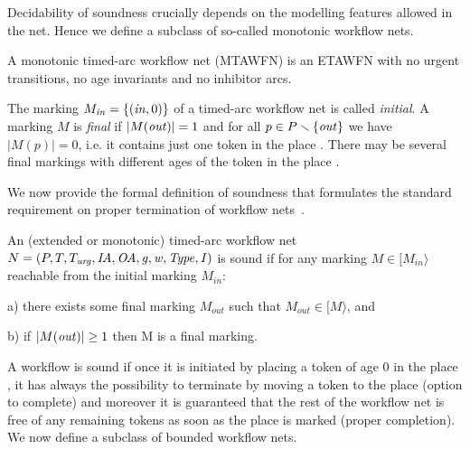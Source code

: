 Decidability of soundness crucially depends on the modelling
features allowed in the net. Hence we define a subclass
of so-called monotonic workflow nets.

\begin{definition} \label{deftawfn}
A monotonic timed-arc workflow net (MTAWFN) is an ETAWFN 
with no urgent transitions, no age invariants and no inhibitor arcs.
\end{definition}

The marking $M_{{\mathit{in}}}=\{(\mathit{in},0)\}$
 of a timed-arc workflow net is called
\emph{initial}. 
A marking $M$ is \emph{final} if 
$|M({\mathit{out}})|= 1$ and for all $p \in P\smallsetminus\{{\mathit{out}}\}$ 
we have $|M(p)|=0$,
i.e. it contains just one token in the place . There may
be several final markings with different ages of the token in the 
place .

We now provide the formal definition of soundness that formulates 
the standard requirement on proper termination of workflow
nets~\cite{Aalst98,AalstHHSVVW11}.

\begin{definition} \label{def:soundness}
An (extended or monotonic) timed-arc workflow net $N=(P, T, T_{\mathit{urg}}, \mathit{IA},\allowbreak \mathit{OA}, \mathit{g}, \mathit{w}, \mathit{Type}, \mathit{I})$ is 
sound if for %
any marking $M \in [M_\mathit{in}\rangle$ reachable from the initial
marking $M_\mathit{in}$:
\begin{description}
\item{a)}  there exists some final marking $M_\mathit{out}$ such that 
           $M_\mathit{out} \in [M\rangle$, and 
\item{b)} if $|M({\mathit{out}})|\geq 1$ then M is a final marking.
\end{description}
\end{definition}

A workflow is sound if once it is initiated by placing a token of age $0$ in
the place , it has always the possibility to terminate by moving 
a token to the place  (option to complete)
and moreover it is guaranteed that the rest of the workflow net is free 
of any remaining tokens as soon as the place  is marked 
(proper completion).
We now define a subclass of bounded workflow nets.

